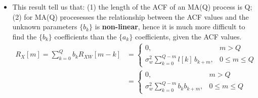 \begin{itemize}
\item This result tell us that: (1) the length of the ACF of an MA(Q) process is Q;(2) for MA(Q) procesesses the relationship between the ACF values and the unknown parameters \(\{b_k\}\) is \textbf{non-linear}, hence it is much more difficult to find the \(\{b_k\}\) coefficients than the \(\{a_k\}\) coefficients, given the ACF values.
\begin{align*}
R_X[m] = \sum_{k=0}^{Q} b_k R_{XW}[m-k]
&=
\begin{cases}
0, & m>Q \\[8pt]
\sigma_w^2 \displaystyle\sum_{k=0}^{Q-m} l[k]\,b_{k+m}, & 0\le m \le Q
\end{cases}\\[4pt]
&=
\begin{cases}
0, & m>Q \\[8pt]
\sigma_w^2 \displaystyle\sum_{k=0}^{Q-m} b_k b_{k+m}, & 0\le m \le Q
\end{cases}
\end{align*}

\end{itemize}
